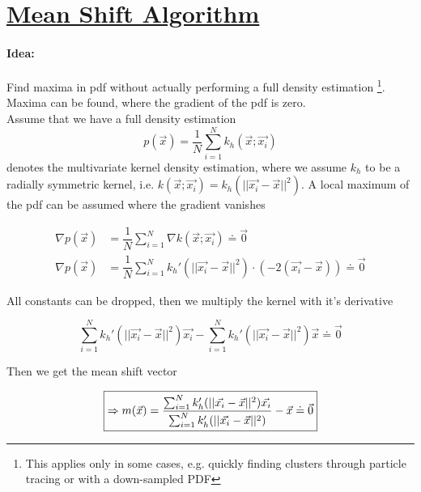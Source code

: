 
\section*{\href{http://ieeexplore.ieee.org/document/1000236/?arnumber=1000236&tag=1}{Mean Shift Algorithm}}

\paragraph{Idea:}
Find maxima in pdf without actually performing a full density estimation \footnote{This applies only in some cases, e.g. quickly finding clusters through particle tracing or with a down-sampled PDF}. Maxima can be found, where the gradient of the pdf is zero. \\

Assume that we have a full density estimation
\begin{equation*}
p(\vec{x}) = \dfrac{1}{N} \sum_{i=1}^N k_h(\vec{x}; \vec{x_i})
\end{equation*}
denotes the multivariate kernel density estimation, where we assume $k_h$ to be a radially symmetric kernel, i.e. $k(\vec{x}; \vec{x_i}) = k_h(||\vec{x_i} - \vec{x}||^2)$. A local maximum of the pdf can be assumed where the gradient vanishes 


\begin{align*}
	\nabla p(\vec{x}) &= \dfrac{1}{N} \sum_{i=1}^N \nabla k(\vec{x}; \vec{x_i}) \doteq \vec{0} \\
	\nabla p(\vec{x}) &= \dfrac{1}{N} \sum_{i=1}^N k_h'(||\vec{x_i} - \vec{x}||^2) \cdot (-2 (\vec{x_i} - \vec{x})) \doteq \vec{0}
\end{align*}

All constants can be dropped, then we multiply the kernel with it's derivative

\begin{equation*}
  \sum_{i=1}^N k_h'(||\vec{x_i} - \vec{x}||^2) \vec{x_i} - \sum_{i=1}^N k_h'(||\vec{x_i} - \vec{x}||^2) \vec{x} \doteq \vec{0}
\end{equation*}

Then we get the mean shift vector

\begin{equation*}
  \boxed{\label{mean-shift-vector}
  \Rightarrow m(\vec{x}) = \dfrac{\sum_{i=1}^N k_h'(||\vec{x_i} - \vec{x}||^2) \vec{x_i}}{\sum_{i=1}^N k_h'(||\vec{x_i} - \vec{x}||^2)} - \vec{x} \doteq \vec{0}}
\end{equation*}

